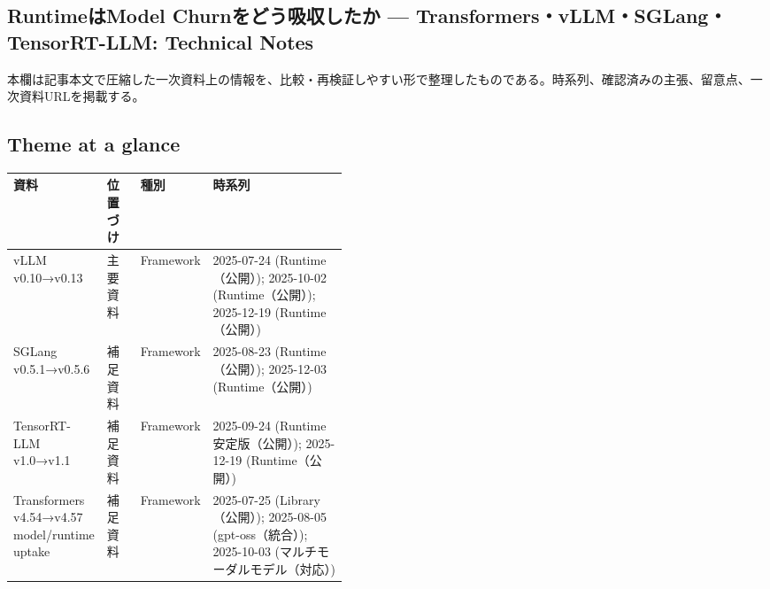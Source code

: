 \subsection*{RuntimeはModel Churnをどう吸収したか — Transformers・vLLM・SGLang・TensorRT-LLM: Technical Notes}
本欄は記事本文で圧縮した一次資料上の情報を、比較・再検証しやすい形で整理したものである。時系列、確認済みの主張、留意点、一次資料URLを掲載する。
\medskip
\subsection*{Theme at a glance}
\begin{center}
\footnotesize
\begin{tabularx}{\linewidth}{@{}p{0.20\linewidth}p{0.10\linewidth}p{0.14\linewidth}X@{}}
\toprule
資料 & 位置づけ & 種別 & 時系列 \\
\midrule
vLLM v0.10→v0.13 & 主要資料 & Framework & 2025-07-24 (Runtime（公開）); 2025-10-02 (Runtime（公開）); 2025-12-19 (Runtime（公開）)      \\
SGLang v0.5.1→v0.5.6 & 補足資料 & Framework & 2025-08-23 (Runtime（公開）); 2025-12-03 (Runtime（公開）)      \\
TensorRT-LLM v1.0→v1.1 & 補足資料 & Framework & 2025-09-24 (Runtime安定版（公開）); 2025-12-19 (Runtime（公開）)      \\
Transformers v4.54→v4.57 model/runtime uptake & 補足資料 & Framework & 2025-07-25 (Library（公開）); 2025-08-05 (gpt-oss（統合）); 2025-10-03 (マルチモーダルモデル（対応）)      \\
\bottomrule
\end{tabularx}
\end{center}
\normalsize


